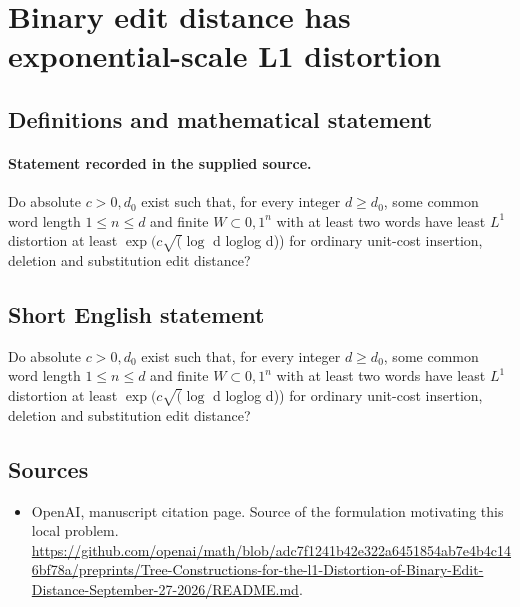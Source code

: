 \documentclass[11pt]{article}
\begin{document}
\section*{Binary edit distance has exponential-scale L1 distortion}\label{statement}
\subsection{Definitions and mathematical statement}
\paragraph{Statement recorded in the supplied source.}
Do absolute $c>0,d_{0}$ exist such that, for every integer $d\geq d_{0}$, some common word length $1\leq n\leq d$ and finite $W\subset {0,1}^{n}$ with at least two words have least $L^{1}$ distortion at least $\exp (c\surd (\log $ d loglog d)) for ordinary unit-cost insertion, deletion and substitution edit distance?
\subsection{Short English statement}
Do absolute $c>0,d_{0}$ exist such that, for every integer $d\geq d_{0}$, some common word length $1\leq n\leq d$ and finite $W\subset {0,1}^{n}$ with at least two words have least $L^{1}$ distortion at least $\exp (c\surd (\log $ d loglog d)) for ordinary unit-cost insertion, deletion and substitution edit distance?
\subsection{Sources}
\begin{itemize}
\item[S1] OpenAI, manuscript citation page. Source of the formulation motivating this local problem.
\url{https://github.com/openai/math/blob/adc7f1241b42e322a6451854ab7e4b4c146bf78a/preprints/Tree-Constructions-for-the-l1-Distortion-of-Binary-Edit-Distance-September-27-2026/README.md}.
\end{itemize}
\end{document}
